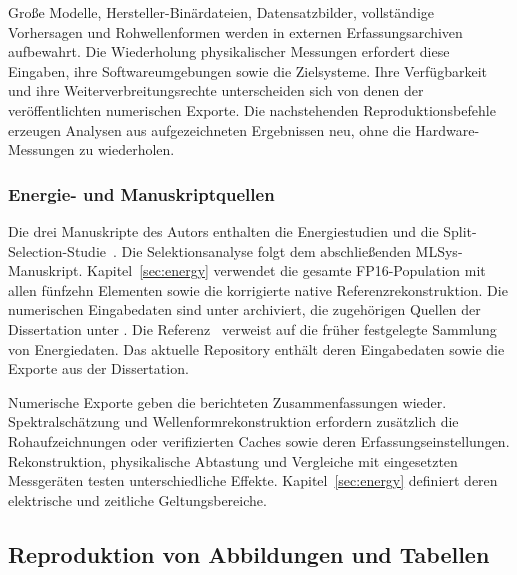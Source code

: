 Große Modelle, Hersteller-Binärdateien, Datensatzbilder, vollständige Vorhersagen und Rohwellenformen werden in externen Erfassungsarchiven aufbewahrt. Die Wiederholung physikalischer Messungen erfordert diese Eingaben, ihre Softwareumgebungen sowie die Zielsysteme. Ihre Verfügbarkeit und ihre Weiterverbreitungsrechte unterscheiden sich von denen der veröffentlichten numerischen Exporte. Die nachstehenden Reproduktionsbefehle erzeugen Analysen aus aufgezeichneten Ergebnissen neu, ohne die Hardware-Messungen zu wiederholen.

\subsubsection{Energie- und Manuskriptquellen}
\label{app:energy_evidence_v43}

Die drei Manuskripte des Autors enthalten die Energiestudien und die Split-Selection-Studie~\cite{mika2026parmaEnergy,mika2026timEnergy,mika2026mlsysSplit}. Die Selektionsanalyse folgt dem abschließenden MLSys-Manuskript. Kapitel~\ref{sec:energy} verwendet die gesamte FP16-Population mit allen fünfzehn Elementen sowie die korrigierte native Referenzrekonstruktion. Die numerischen Eingabedaten sind unter  archiviert, die zugehörigen Quellen der Dissertation unter . Die Referenz~\cite{energyEvidence2026} verweist auf die früher festgelegte Sammlung von Energiedaten. Das aktuelle Repository enthält deren Eingabedaten sowie die Exporte aus der Dissertation.

Numerische Exporte geben die berichteten Zusammenfassungen wieder. Spektralschätzung und Wellenformrekonstruktion erfordern zusätzlich die Rohaufzeichnungen oder verifizierten Caches sowie deren Erfassungseinstellungen. Rekonstruktion, physikalische Abtastung und Vergleiche mit eingesetzten Messgeräten testen unterschiedliche Effekte. Kapitel~\ref{sec:energy} definiert deren elektrische und zeitliche Geltungsbereiche.

\subsection{Reproduktion von Abbildungen und Tabellen}
\label{app:current_selection_reproduction}

